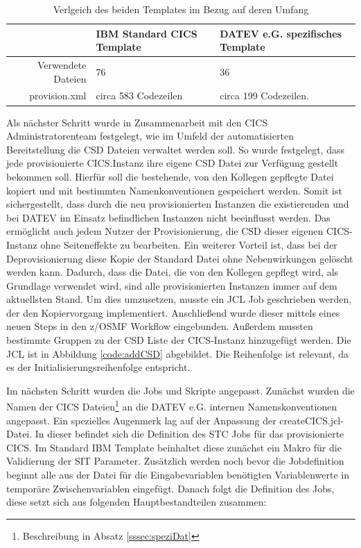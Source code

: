 \begin{table}[h]
\centering
\begin{tabularx}{\textwidth}{r|X|X}
& IBM Standard CICS Template & DATEV e.G. spezifisches Template \\
\hline
Verwendete Dateien & 76 & 36 \\
\hline
provision.xml & circa 583 Codezeilen & circa 199 Codezeilen. \\
\end{tabularx}
\caption{Verlgeich des beiden Templates im Bezug auf deren Umfang}
\label{tab:vglTemps}
\end{table}

Als nächster Schritt wurde in Zusammenarbeit mit den CICS Administratorenteam festgelegt, wie im Umfeld der automatisierten Bereitstellung die CSD Dateien verwaltet werden soll.
So wurde festgelegt, dass jede provisionierte CICS.Instanz ihre eigene CSD Datei zur Verfügung gestellt bekommen soll.
Hierfür soll die bestehende, von den Kollegen gepflegte Datei kopiert und mit bestimmten Namenkonventionen gespeichert werden.
Somit ist sichergestellt, dass durch die neu provisionierten Instanzen die existierenden und bei DATEV im Einsatz befindlichen Instanzen nicht beeinflusst werden.
Das ermöglicht auch jedem Nutzer der Provisionierung, die CSD dieser eigenen CICS-Instanz ohne Seiteneffekte zu bearbeiten.
Ein weiterer Vorteil ist, dass bei der Deprovisionierung diese Kopie der Standard Datei ohne Nebenwirkungen gelöscht werden kann.
Dadurch, dass die Datei, die von den Kollegen gepflegt wird, als Grundlage verwendet wird, sind alle provisionierten Instanzen immer auf dem aktuellsten Stand.
Um dies umzusetzen, musste ein JCL Job geschrieben werden, der den Kopiervorgang implementiert.
Anschließend wurde dieser mittels eines neuen Steps in den z/OSMF Workflow eingebunden.
Außerdem mussten bestimmte Gruppen zu der CSD Liste der CICS-Instanz hinzugefügt werden.
Die JCL ist in Abbildung \ref{code:addCSD} abgebildet.
Die Reihenfolge ist relevant, da es der Initialisierungsreihenfolge entspricht.

\begin{minipage}{\linewidth}

\end{minipage}

Im nächsten Schritt wurden die Jobs und Skripte angepasst.
Zunächst wurden die Namen der CICS Dateien\footnote{Beschreibung in Absatz \ref{sssec:speziDat}} an die DATEV e.G. internen Namenskonventionen angepasst.
Ein spezielles Augenmerk lag auf der Anpassung der \glqq createCICS.jcl\grqq-Datei.
In dieser befindet sich die Definition des STC Jobs für das provisionierte CICS.
Im Standard IBM Template beinhaltet diese zunächst ein Makro für die Validierung der SIT Parameter.
Zusätzlich werden noch bevor die Jobdefinition beginnt alle aus der Datei für die Eingabevariablen benötigten Variablenwerte in temporäre Zwischenvariablen eingefügt.
Danach folgt die Definition des Jobs, diese setzt sich aus folgenden Hauptbestandteilen zusammen:

